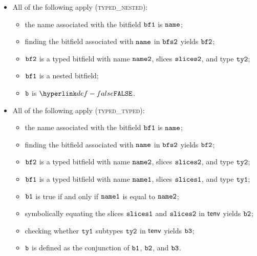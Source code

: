 \begin{itemize}
  \item All of the following apply (\textsc{typed\_nested}):
  \begin{itemize}
    \item the name associated with the bitfield $\texttt{bf1}$ is $\texttt{name}$;
    \item finding the bitfield associated with $\texttt{name}$ in $\texttt{bfs2}$ yields $\texttt{bf2}$;
    \item $\texttt{bf2}$ is a typed bitfield with name $\texttt{name2}$, slices $\texttt{slices2}$, and type $\texttt{ty2}$;
    \item $\texttt{bf1}$ is a nested bitfield;
    \item $\texttt{b}$ is $\False$.
  \end{itemize}

  \item All of the following apply (\textsc{typed\_typed}):
  \begin{itemize}
    \item the name associated with the bitfield $\texttt{bf1}$ is $\texttt{name}$;
    \item finding the bitfield associated with $\texttt{name}$ in $\texttt{bfs2}$ yields $\texttt{bf2}$;
    \item $\texttt{bf2}$ is a typed bitfield with name $\texttt{name2}$, slices $\texttt{slices2}$, and type $\texttt{ty2}$;
    \item $\texttt{bf1}$ is a typed bitfield with name $\texttt{name1}$, slices $\texttt{slices1}$, and type $\texttt{ty1}$;
    \item $\texttt{b1}$ is true if and only if $\texttt{name1}$ is equal to $\texttt{name2}$;
    \item symbolically equating the slices $\texttt{slices1}$ and $\texttt{slices2}$ in $\textsf{tenv}$ yields $\texttt{b2}$;
    \item checking whether $\texttt{ty1}$ subtypes $\texttt{ty2}$ in $\textsf{tenv}$ yields $\texttt{b3}$;
    \item $\texttt{b}$ is defined as the conjunction of $\texttt{b1}$, $\texttt{b2}$, and $\texttt{b3}$.
  \end{itemize}
\end{itemize}


